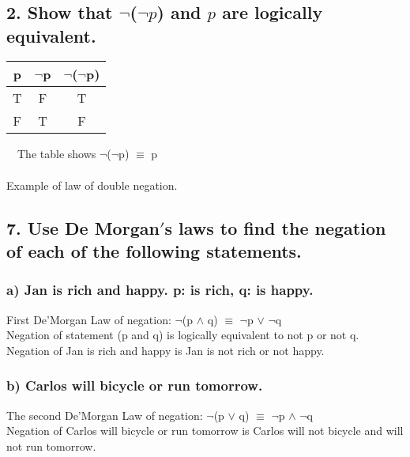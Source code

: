 \documentclass[11pt, oneside]{article} %
\numberwithin{equation}{section} %
\numberwithin{figure}{section} %
\numberwithin{table}{section} %
\begin{document}
\section{}
\begin{table}[!htbp]
\subsection{2. Show that $\neg$($\neg$$p$) and $p$ are logically equivalent.}
\begin{tabular}{c c c}
\hline\hline
p & $\neg$p &  $\neg$($\neg$p) \\ [0.5ex] 
\hline
T & F & T\\
F & T & F \\ [1ex]
\hline
\end{tabular}
$\quad$The table shows $\neg$($\neg$p) $\equiv$ p \\
\\
Example of law of double negation.
\label{table:nonlin}
\end{table}

\subsection{7. Use De Morgan$'$s laws to find the negation of each of the following statements.}
\subsubsection{a) Jan is rich and happy. p: is rich, q: is happy.}
First De'Morgan Law of negation: $\neg$(p $\wedge$ q) $\equiv$ $\neg$p $\vee$ $\neg$q\\
Negation of statement (p and q) is logically equivalent to not p or not q. \\
Negation of Jan is rich and happy is Jan is not rich or not happy.
\subsubsection{b) Carlos will bicycle or run tomorrow.}
The second De'Morgan Law of negation: $\neg$(p $\vee$ q) $\equiv$ $\neg$p $\wedge$ $\neg$q \\
Negation of Carlos will bicycle or run tomorrow is Carlos will not bicycle and will not run tomorrow.
\end{document}
